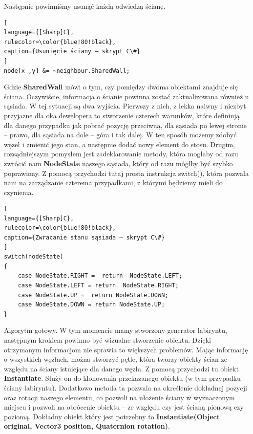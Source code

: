 \documentclass[oneside,polski,logo]{amuthesis}
\begin{document}
Następnie powinniśmy usunąć każdą odwiedzą ścianę. 

\begin{lstlisting}[
language={[Sharp]C},
rulecolor=\color{blue!80!black},
caption={Usunięcie ściany – skrypt C\#}
]
node[x ,y] &= ~neighbour.SharedWall;
\end{lstlisting}

Gdzie \textbf{SharedWall} mówi o tym, czy pomiędzy dwoma obiektami znajduje się ściana. Oczywiście, informacja o ścianie powinna zostać zaktualizowana również u sąsiada. W tej sytuacji są dwa wyjścia. Pierwszy z nich, z lekka naiwny i niezbyt przyjazne dla oka dewelopera to stworzenie czterech warunków, które definiują dla danego przypadku jak pobrać pozycję przeciwną, dla sąsiada po lewej stronie – prawo, dla sąsiada na dole – góra i tak dalej. W ten sposób możemy zdobyć węzeł i zmienić jego stan, a następnie dodać nowy element do stosu. Drugim, rozsądniejszym pomysłem jest zadeklarowanie metody, która mogłaby od razu zwrócić nam \textbf{NodeState} naszego sąsiada, który od razu mógłby być szybko poprawiony. Z pomocą przychodzi tutaj prosta instrukcja switch(), która pozwala nam na zarządzanie czterema przypadkami, z którymi będziemy mieli do czynienia.


\begin{lstlisting}[
language={[Sharp]C},
rulecolor=\color{blue!80!black},
caption={Zwracanie stanu sąsiada – skrypt C\#}
]
switch(nodeState)
{
	case NodeState.RIGHT =  return  NodeState.LEFT;
	case NodeState.LEFT = return  NodeState.RIGHT;
	case NodeState.UP =  return NodeState.DOWN;
	case NodeState.DOWN = return NodeState.UP;
}
\end{lstlisting}

Algorytm gotowy. W tym momencie mamy stworzony generator labiryntu, następnym krokiem powinno być wizualne stworzenie obiektu. Dzięki otrzymanym informacjom nie sprawia to większych problemów. Mając informację o wszystkich węzłach, można stworzyć pętle, która tworzy obiekty ścian ze względu na ściany istniejące dla danego węzła. Z pomocą przychodzi tu obiekt \textbf{Instantiate}. Służy on do klonowania przekazanego obiektu (w tym przypadku ściany labiryntu). Dodatkowo metoda ta pozwala na określenie dokładnej pozycji oraz rotacji naszego elementu, co pozwoli na ułożenie ściany w wyznaczonym miejscu i pozwoli na obrócenie obiektu – ze względu czy jest ścianą pionową czy poziomą. Dokładny obiekt który jest potrzebny to \textbf{Instantiate(Object original, Vector3 position, Quaternion rotation)}. \cite{Instantiate}
\end{document}
